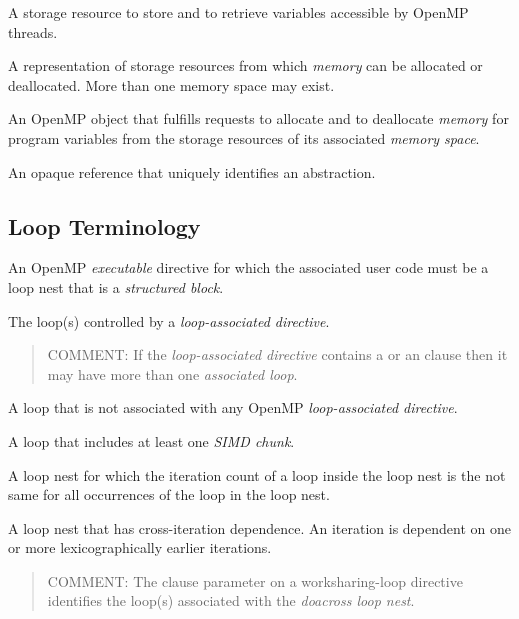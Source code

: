 \glossarydefstart
A storage resource to store and to retrieve variables accessible by 
OpenMP threads.
\glossarydefend

\glossarydefstart
A representation of storage resources from which \emph{memory} can 
be allocated or deallocated.  More than one memory space may exist.
\glossarydefend

\glossarydefstart
An OpenMP object that fulfills requests to allocate and to deallocate 
\emph{memory} for program variables from the storage resources of its 
associated \emph{memory space}.
\glossarydefend

\glossarydefstart
An opaque reference that uniquely identifies an abstraction.
\glossarydefend


%
%
% 
\subsection{Loop Terminology}
\label{subsec:Loop Terminology}
\glossarydefstart
An OpenMP \emph{executable} directive for which the associated user 
code must be a loop nest that is a \emph{structured block}.
\glossarydefend

\glossarydefstart
The loop(s) controlled by a \emph{loop-associated directive}.
\begin{quote}
COMMENT: If the \emph{loop-associated directive} contains a  or 
an \code{)} clause then it may have more than 
one \emph{associated loop}.
\end{quote}
\glossarydefend

\glossarydefstart
A loop that is not associated with any OpenMP \emph{loop-associated directive}.
\glossarydefend

\glossarydefstart
A loop that includes at least one \emph{SIMD chunk}.
\glossarydefend

\glossarydefstart
A loop nest for which the iteration count of a loop inside the loop nest is the
not same for all occurrences of the loop in the loop nest.
\glossarydefend

\glossarydefstart
A loop nest that has cross-iteration dependence. An iteration is dependent 
on one or more lexicographically earlier iterations.
\begin{quote}
COMMENT: The  clause parameter on a worksharing-loop directive identifies 
the loop(s) associated with the \emph{doacross loop nest}.
\end{quote}
\glossarydefend

